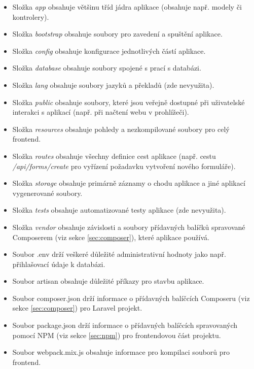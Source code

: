 	\begin{itemize}
		\item Složka \textit{app} obsahuje většinu tříd jádra aplikace (obsahuje např. modely či kontrolery). \cite{LaravelDir}
		\item Složka \textit{bootstrap} obsahuje soubory pro zavedení a spuštění aplikace. \cite{LaravelDir}
		\item Složka \textit{config} obsahuje konfigurace jednotlivých částí aplikace. \cite{LaravelDir}
		\item Složka \textit{database} obsahuje soubory spojené s prací s databázi. \cite{LaravelDir}
		\item Složka \textit{lang} obsahuje soubory jazyků a překladů (zde nevyužita). \cite{LaravelDir}
		\item Složka \textit{public} obsahuje soubory, které jsou veřejně dostupné při uživatelské interakci s aplikací (např. při načtení webu v prohlížeči). \cite{LaravelDir}
		\item Složka \textit{resources} obsahuje pohledy a nezkompilované soubory pro celý frontend. \cite{LaravelDir}
		\item Složka \textit{routes} obsahuje všechny definice cest aplikace (např. cestu \textit{/api/forms/create} pro vyřízení požadavku vytvoření nového formuláře). \cite{LaravelDir}
		\item Složka \textit{storage} obsahuje primárně záznamy o chodu aplikace a jiné aplikací vygenerované soubory. \cite{LaravelDir}
		\item Složka \textit{tests} obsahuje automatizované testy aplikace (zde nevyužita). \cite{LaravelDir}
		\item Složka \textit{vendor} obsahuje závislosti a soubory přídavných balíčků spravované Composerem (viz sekce \ref{sec:composer}), které aplikace používá. \cite{LaravelDir}
		\item Soubor .env drží veškeré důležité administrativní hodnoty jako např. přihlašovací údaje k databázi.
		\item Soubor artisan obsahuje důležité příkazy pro stavbu aplikace. \cite{LaravelArtisan}
		\item Soubor composer.json drží informace o přídavných balíčcích Composeru (viz sekce \ref{sec:composer}) pro Laravel projekt. \cite{ComposerpJSON}
		\item Soubor package.json drží informace o přídavných balíčcích spravovaných pomocí NPM (viz sekce \ref{sec:npm}) pro frontendovou část projektu. \cite{NPMpJSON}
		\item Soubor webpack.mix.js obsahuje informace pro kompilaci souborů pro frontend. \cite{LaravelJSCSS}
	\end{itemize}

